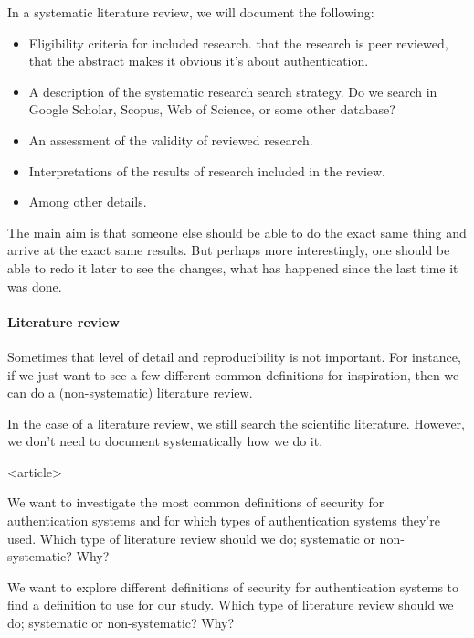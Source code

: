 In a systematic literature review, we will document the 
following\autocite{ElsevierSLR}:
\begin{itemize}
  \item Eligibility criteria for included research.
    \Eg that the research is peer reviewed, that the abstract makes it 
    obvious it's about authentication.
  \item A description of the systematic research search strategy.
    Do we search in Google Scholar, Scopus, Web of Science, or some other 
    database?
  \item An assessment of the validity of reviewed research.
  \item Interpretations of the results of research included in the review.
  \item Among other details.
\end{itemize}
The main aim is that someone else should be able to do the exact same thing and 
arrive at the exact same results.
But perhaps more interestingly, one should be able to redo it later to see the 
changes, what has happened since the last time it was done.

\paragraph{Literature review}

Sometimes that level of detail and reproducibility is not important.
For instance, if we just want to see a few different common definitions for 
inspiration, then we can do a (non-systematic) literature review.

In the case of a literature review, we still search the scientific literature.
However, we don't need to document systematically how we do it.

\begin{frame}<article>
  \begin{exercise}
    We want to investigate the most common definitions of security for 
    authentication systems and for which types of authentication systems 
    they're used.
    Which type of literature review should we do; systematic or non-systematic?
    Why?
  \end{exercise}


  \begin{exercise}
    We want to explore different definitions of security for authentication 
    systems to find a definition to use for our study.
    Which type of literature review should we do; systematic or non-systematic?
    Why?
  \end{exercise}
\end{frame}


